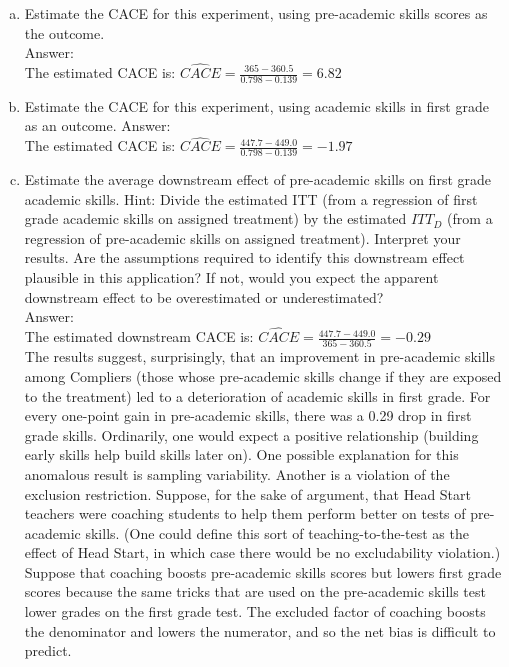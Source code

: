 \documentclass[11pt,notitlepage]{article}\usepackage[]{graphicx}\usepackage[]{color}
\begin{document}
\begin{enumerate}[a)]
\item Estimate the CACE for this experiment, using pre-academic skills scores as the outcome.\\
Answer:\\
The estimated CACE is: $\widehat{CACE} = \frac{365 - 360.5}{0.798 - 0.139} = 6.82$
\item Estimate the CACE for this experiment, using academic skills in first grade as an outcome.
Answer:\\
The estimated CACE is: $\widehat{CACE} = \frac{447.7 - 449.0}{0.798 - 0.139} = -1.97$
\item Estimate the average downstream effect of pre-academic skills on first grade academic skills. Hint: Divide the estimated ITT (from a regression of first grade academic skills on assigned treatment) by the estimated $ITT_D$ (from a regression of pre-academic skills on assigned treatment). Interpret your results. Are the assumptions required to identify this downstream effect plausible in this application? If not, would you expect the apparent downstream effect to be overestimated or underestimated?\\
Answer:\\
The estimated downstream CACE is: $\widehat{CACE} = \frac{447.7 - 449.0}{365 - 360.5} = -0.29$\\
The results suggest, surprisingly, that an improvement in pre-academic skills among Compliers (those whose pre-academic skills change if they are exposed to the treatment) led to a deterioration of academic skills in first grade. For every one-point gain in pre-academic skills, there was a 0.29 drop in first grade skills. Ordinarily, one would expect a positive relationship (building early skills help build skills later on). One possible explanation for this anomalous result is sampling variability. Another is a violation of the exclusion restriction. Suppose, for the sake of argument, that Head Start teachers were coaching students to help them perform better on tests of pre-academic skills. (One could define this sort of teaching-to-the-test as the effect of Head Start, in which case there would be no excludability violation.)  Suppose that coaching boosts pre-academic skills scores but lowers first grade scores because the same tricks that are used on the pre-academic skills test lower grades on the first grade test. The excluded factor of coaching boosts the denominator and lowers the numerator, and so the net bias is difficult to predict.

\end{enumerate}
\end{document}
